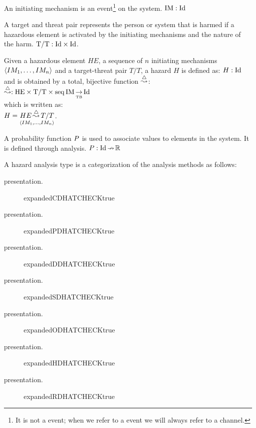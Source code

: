 
\begin{definition}
An initiating mechanism is an event\footnote{It is not a \CSP event; when we refer to a \CSP event we will always refer to a channel.} on the system.
%
$\hmdatatypeIM: \hmdatatypeId$
\end{definition}

\begin{definition}
A target and threat pair represents the person or system that is harmed if a hazardous element is activated by the initiating mechanisms and the nature of the harm. 
%
$\hmdatatypeTT: \hmcartesian{\hmdatatypeId}{\hmdatatypeId}$.
\end{definition}

\begin{definition}[Hazard]
Given a hazardous element $HE$, a sequence of $n$ initiating mechanisms $\hmseqenum{IM_1, \ldots, IM_n}$ and a target-threat pair $T/T$, a hazard $H$ is defined as: $H: \hmdatatypeId$ and is obtained by a total, bijective function $\hmhazardsymbol$: 
%
\\$\hmhazardsymbol: \hmtotalbijectivefunction{\hmcartesian{\hmcartesian{\hmdatatypeHE}{\hmdatatypeTT}}{\hmseq{\hmdatatypeIM}}}{\hmdatatypeId}$
%
\\which is written as:
%
\\$H = \hmhazard{HE}{\hmseqenum{IM_1, \ldots, IM_n}}{T/T}$.
\end{definition}

\begin{definition}
A probability function $\hmprobabilitysymbol$ is used to associate values to elements in the system.
%
It is defined through analysis. 
%
$\hmprobabilitysymbol: \hmpartialfunction{\hmdatatypeId}{\hmdatatypeR}$
\end{definition}

\begin{definition}
A hazard analysis type is a categorization of the analysis methods as follows:
%
\newcommand{\HATdescr}[1]{\item[\expandafter\csname #1presentation\endcsname.] \expandafter\csname #1expanded\endcsname\csname #1CHECKtrue\endcsname}
%
\begin{description}
  \HATdescr{CDHAT}
  \HATdescr{PDHAT}
  \HATdescr{DDHAT}
  \HATdescr{SDHAT}
  \HATdescr{ODHAT}
  \HATdescr{HDHAT}
  \HATdescr{RDHAT} 
\end{description}
\end{definition}

